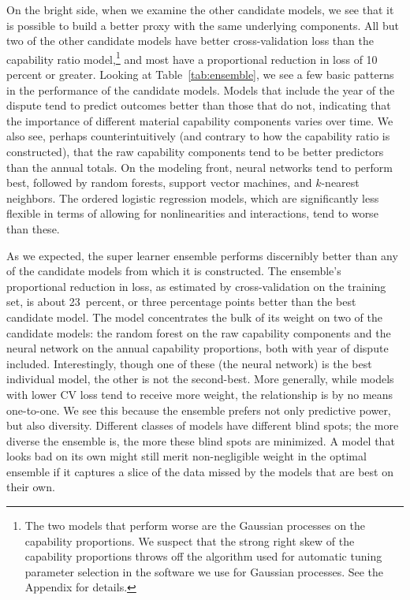 On the bright side, when we examine the other candidate models, we see that it is possible to build a better proxy with the same underlying components.
All but two of the other candidate models have better cross-validation loss than the capability ratio model,\footnote{
  The two models that perform worse are the Gaussian processes on the capability proportions.
  We suspect that the strong right skew of the capability proportions throws off the algorithm used for automatic tuning parameter selection in the software we use for Gaussian processes.
  See the Appendix for details.
}
and most have a proportional reduction in loss of 10 percent or greater.
Looking at Table~\ref{tab:ensemble}, we see a few basic patterns in the performance of the candidate models.
Models that include the year of the dispute tend to predict outcomes better than those that do not, indicating that the importance of different material capability components varies over time.
We also see, perhaps counterintuitively (and contrary to how the capability ratio is constructed), that the raw capability components tend to be better predictors than the annual totals.
On the modeling front, neural networks tend to perform best, followed by random forests, support vector machines, and $k$-nearest neighbors.
The ordered logistic regression models, which are significantly less flexible in terms of allowing for nonlinearities and interactions, tend to worse than these.

As we expected, the super learner ensemble performs discernibly better than any of the candidate models from which it is constructed.
The ensemble's proportional reduction in loss, as estimated by cross-validation on the training set, is about 23~percent, or three percentage points better than the best candidate model.
The model concentrates the bulk of its weight on two of the candidate models: the random forest on the raw capability components and the neural network on the annual capability proportions, both with year of dispute included.
Interestingly, though one of these (the neural network) is the best individual model, the other is not the second-best.
More generally, while models with lower CV loss tend to receive more weight, the relationship is by no means one-to-one.
We see this because the ensemble prefers not only predictive power, but also diversity.
Different classes of models have different blind spots; the more diverse the ensemble is, the more these blind spots are minimized.
A model that looks bad on its own might still merit non-negligible weight in the optimal ensemble if it captures a slice of the data missed by the models that are best on their own.

